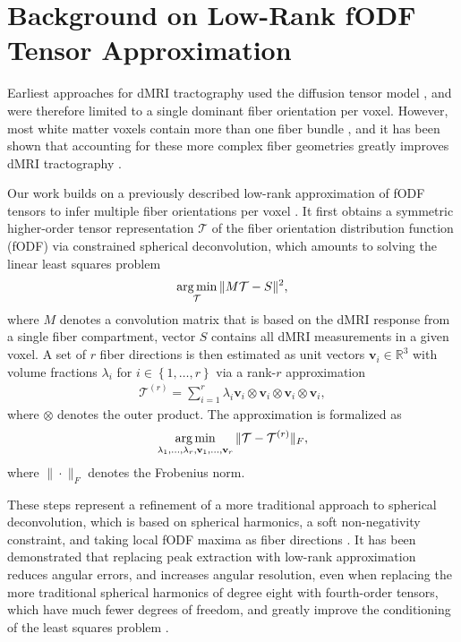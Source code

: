 \section{Background on Low-Rank fODF Tensor Approximation}\label{sec:background}
Earliest approaches for dMRI tractography used the diffusion tensor model
\cite{Mori:1999}, and were therefore limited to a single dominant fiber orientation
per voxel. However, most white matter voxels contain more than one fiber bundle \cite{Jeurissen:2012}, and it has been shown
that accounting for these more complex fiber geometries greatly improves dMRI
tractography \cite{Neher:2015}.

Our work builds on a previously described low-rank approximation of fODF tensors to infer multiple fiber orientations per voxel \cite{lowrank,Ankele:CARS2017}. It first obtains a symmetric higher-order tensor representation $\mathcal{T}$ of the fiber orientation distribution function (fODF) via constrained spherical deconvolution, which amounts to solving the linear least squares problem 
\begin{align}
	\operatorname*{arg\,min}_{\mathcal{T}} \| M \mathcal{T} - S \|^2,
	\label{eq:sd-min}
\end{align}
where 
$M$ denotes a convolution matrix that is based on the dMRI response from a
single fiber compartment, vector $S$ contains all dMRI measurements in a given
voxel. A set of $r$ fiber directions is then estimated as unit vectors
$\mathbf{v}_i \in \mathbb{R}^3$ with volume fractions $\lambda_i$ for $i \in
\left\{ 1 , \dots , r \right\}$ via a rank-$r$
approximation 
\begin{align}
	\mathcal{T}^{\left( r \right)} = \sum_{i=1}^r \lambda_i \mathbf{v}_i
	\otimes \mathbf{v}_i \otimes \mathbf{v}_i \otimes \mathbf{v}_i,
	\label{eq:low-rank}
\end{align}
where $\otimes$ denotes the
outer product. The approximation is formalized as
\[ \operatorname*{arg\,min}_{\lambda_1, \dots , \lambda_r , \mathbf{v}_1, \dots , \mathbf{v}_r}
\| \mathcal{T} - \mathcal{T}^{\left( r \right)} \|_F, \]
where $\| \cdot \|_F$ denotes the Frobenius norm.

These steps represent a refinement of a more traditional approach to spherical deconvolution, which is based on spherical harmonics, a soft non-negativity constraint, and taking local fODF maxima as fiber directions \cite{TOURNIER20071459}. It has been demonstrated that replacing peak extraction with low-rank approximation reduces angular errors, and increases angular resolution, even when replacing the more traditional spherical harmonics of degree eight with fourth-order tensors, which have much fewer degrees of freedom, and greatly improve the conditioning of the least squares problem \cite{Ankele:CARS2017}.

